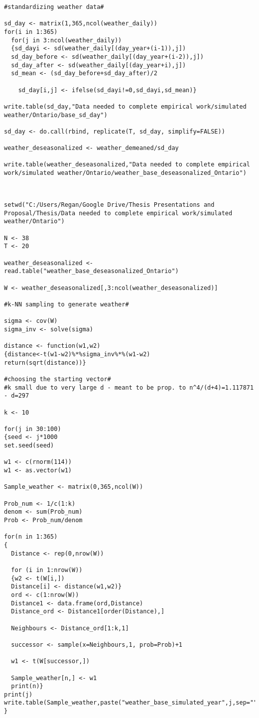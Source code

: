\begin{lstlisting}
#standardizing weather data#

sd_day <- matrix(1,365,ncol(weather_daily))
for(i in 1:365)
  for(j in 3:ncol(weather_daily))
  {sd_dayi <- sd(weather_daily[(day_year+(i-1)),j])
  sd_day_before <- sd(weather_daily[(day_year+(i-2)),j])
  sd_day_after <- sd(weather_daily[(day_year+i),j])
  sd_mean <- (sd_day_before+sd_day_after)/2
  
    sd_day[i,j] <- ifelse(sd_dayi!=0,sd_dayi,sd_mean)}

write.table(sd_day,"Data needed to complete empirical work/simulated weather/Ontario/base_sd_day")

sd_day <- do.call(rbind, replicate(T, sd_day, simplify=FALSE))

weather_deseasonalized <- weather_demeaned/sd_day

write.table(weather_deseasonalized,"Data needed to complete empirical work/simulated weather/Ontario/weather_base_deseasonalized_Ontario")


\end{lstlisting}

\begin{lstlisting}

setwd("C:/Users/Regan/Google Drive/Thesis Presentations and Proposal/Thesis/Data needed to complete empirical work/simulated weather/Ontario")

N <- 38
T <- 20

weather_deseasonalized <- read.table("weather_base_deseasonalized_Ontario")

W <- weather_deseasonalized[,3:ncol(weather_deseasonalized)]

#k-NN sampling to generate weather#

sigma <- cov(W)
sigma_inv <- solve(sigma)

distance <- function(w1,w2)
{distance<-t(w1-w2)%*%sigma_inv%*%(w1-w2)
return(sqrt(distance))}

#choosing the starting vector#
#k small due to very large d - meant to be prop. to n^4/(d+4)=1.117871 - d=297

k <- 10

for(j in 30:100)
{seed <- j*1000
set.seed(seed)

w1 <- c(rnorm(114))
w1 <- as.vector(w1)

Sample_weather <- matrix(0,365,ncol(W))

Prob_num <- 1/c(1:k)
denom <- sum(Prob_num)
Prob <- Prob_num/denom

for(n in 1:365)
{
  Distance <- rep(0,nrow(W))
  
  for (i in 1:nrow(W))
  {w2 <- t(W[i,])
  Distance[i] <- distance(w1,w2)}
  ord <- c(1:nrow(W))
  Distance1 <- data.frame(ord,Distance)
  Distance_ord <- Distance1[order(Distance),]
  
  Neighbours <- Distance_ord[1:k,1]
  
  successor <- sample(x=Neighbours,1, prob=Prob)+1
  
  w1 <- t(W[successor,]) 
  
  Sample_weather[n,] <- w1
  print(n)}
print(j)
write.table(Sample_weather,paste("weather_base_simulated_year",j,sep=""))
}
\end{lstlisting}

